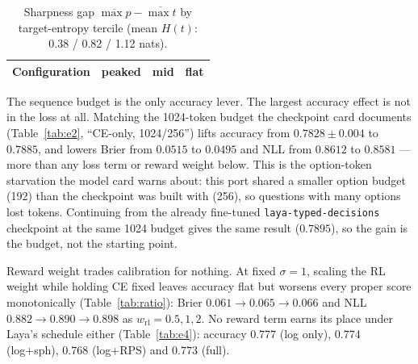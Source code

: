 \documentclass[conference]{IEEEtran}
\begin{document}
\begin{table}[t]
\caption{Sharpness gap $\overline{\max p}-\overline{\max t}$ by target-entropy tercile (mean $H(t)$: 0.38 / 0.82 / 1.12 nats).}
\label{tab:entropy}
\centering
\footnotesize
\begin{tabular}{@{}lccc@{}}
\toprule
Configuration & peaked & mid & flat \\
\midrule

\end{tabular}
\end{table}

The sequence budget is the only accuracy lever. The largest accuracy effect is
not in the loss at all. Matching the 1024-token budget the checkpoint card
documents (Table~\ref{tab:e2}, ``CE-only, 1024/256'') lifts accuracy from
$0.7828\pm0.004$ to $0.7885$, and lowers Brier from $0.0515$ to $0.0495$ and
NLL from $0.8612$ to $0.8581$ --- more than any loss term or reward weight
below. This is the option-token starvation the model card warns about: this
port shared a smaller option budget (192) than the checkpoint was built with
(256), so questions with many options lost tokens. Continuing from the
already fine-tuned \texttt{laya-typed-decisions} checkpoint at the same 1024
budget gives the same result ($0.7895$), so the gain is the budget, not the
starting point.

Reward weight trades calibration for nothing. At fixed $\sigma=1$, scaling the
RL weight while holding CE fixed leaves accuracy flat but worsens every proper
score monotonically (Table~\ref{tab:ratio}): Brier $0.061\to0.065\to0.066$ and
NLL $0.882\to0.890\to0.898$ as $w_\mathrm{rl}=0.5,1,2$. No reward term earns its
place under Laya's schedule either (Table~\ref{tab:e4}): accuracy $0.777$ (log
only), $0.774$ (log+sph), $0.768$ (log+RPS) and $0.773$ (full).

\begin{table}[t]
\caption{Fixed-$\sigma$ sweep (RL+CE; one seed above $\sigma{=}2$): fitted temperature and NLL rise monotonically, accuracy does not.}
\label{tab:sweep}
\centering
\footnotesize
\setlength{\tabcolsep}{3pt}
\end{table}

\begin{table}[t]
\caption{RL weight at fixed $\sigma=1$ (CE fixed): accuracy flat, proper scores worsen monotonically with $w_\mathrm{rl}$.}
\label{tab:ratio}
\centering
\footnotesize
\setlength{\tabcolsep}{3pt}
\end{table}
\end{document}
